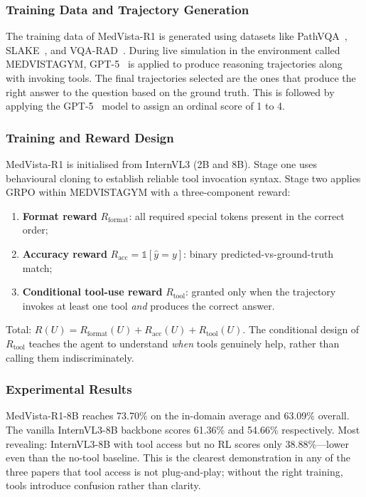 \documentclass[12pt, a4paper]{article}
\begin{document}
\subsubsection{Training Data and Trajectory Generation}

The training data of MedVista-R1 is generated using datasets like
PathVQA~\cite{pathvqa}, SLAKE~\cite{slake}, and VQA-RAD~\cite{vqarad}.
During live simulation in the environment called MEDVISTAGYM, GPT-5~\cite{gpt5} is
applied to produce reasoning trajectories along with invoking tools.
The final trajectories selected are the ones that produce the right answer to the
question based on the ground truth.
This is followed by applying the GPT-5~\cite{gpt5} model to assign an ordinal score
of 1 to 4.

\subsubsection{Training and Reward Design}

MedVista-R1 is initialised from InternVL3 (2B and 8B).
Stage one uses behavioural cloning to establish reliable tool invocation syntax.
Stage two applies GRPO within MEDVISTAGYM with a three-component reward:
\begin{enumerate}
  \item \textbf{Format reward} $R_\text{format}$: all required special tokens present
        in the correct order;
  \item \textbf{Accuracy reward} $R_\text{acc}=\mathbb{1}[\hat{y}=y]$: binary
        predicted-vs-ground-truth match;
  \item \textbf{Conditional tool-use reward} $R_\text{tool}$: granted only when the
        trajectory invokes at least one tool \emph{and} produces the correct answer.
\end{enumerate}
Total: $R(U)=R_\text{format}(U)+R_\text{acc}(U)+R_\text{tool}(U)$.
The conditional design of $R_\text{tool}$ teaches the agent to understand \emph{when}
tools genuinely help, rather than calling them indiscriminately.

\subsubsection{Experimental Results}

MedVista-R1-8B reaches 73.70\% on the in-domain average and 63.09\% overall.
The vanilla InternVL3-8B backbone scores 61.36\% and 54.66\% respectively.
Most revealing: InternVL3-8B with tool access but no RL scores only 38.88\%---lower
even than the no-tool baseline.
This is the clearest demonstration in any of the three papers that tool access is not
plug-and-play; without the right training, tools introduce confusion rather than
clarity.
\end{document}
